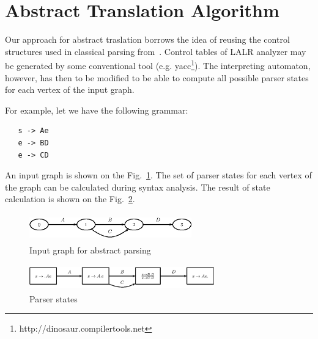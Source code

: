 \section{Abstract Translation Algorithm}
\label{sec:AbstractTranslation}

Our approach for abstract traslation borrows the idea of reusing the control structures used in 
classical parsing from~\cite{AbstrParsing}. Control tables of LALR analyzer may be generated by
some conventional tool (e.g. yacc\footnote{http://dinosaur.compilertools.net}). The interpreting 
automaton, however, has then to be modified to be able to compute all possible parser states 
for each vertex of the input graph. 


For example, let we have the following grammar:

\begin{verbatim}
   s -> Ae
   e -> BD
   e -> CD
\end{verbatim}

An input graph is shown on the Fig.~\ref{pic2}. The set of parser states for each vertex of 
the graph can be calculated during syntax analysis. The result of state calculation is shown on 
the Fig.~\ref{pic3}.

\begin{figure}[h]
    \begin{center}
        \includegraphics[width=7cm,height=1.2cm]{../../graphs/simple_grammar_inpt.eps}
        \caption{Input graph for abstract parsing}
        \label{pic2}
    \end{center}
\end{figure}

\begin{figure}[h]
    \begin{center}
        \includegraphics[width=8cm,height=1.1cm]{../../graphs/simple_grammar_items.eps}
        \caption{Parser states}
        \label{pic3}
    \end{center}
\end{figure}

